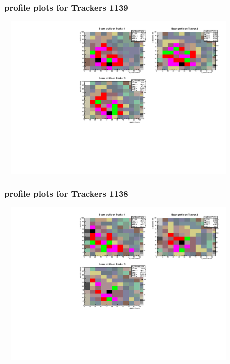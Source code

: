 \documentclass[slidestop,compress,mathserif]{beamer}
\begin{document}
\begin{frame}\frametitle{profile plots for Trackers 1139}
	 \includegraphics[width=12cm,height=8cm]{profile_plots_for_Trackers_1139.pdf}
\end{frame}
\begin{frame}\frametitle{profile plots for Trackers 1138}
	 \includegraphics[width=12cm,height=8cm]{profile_plots_for_Trackers_1138.pdf}
\end{frame}
\end{document}
